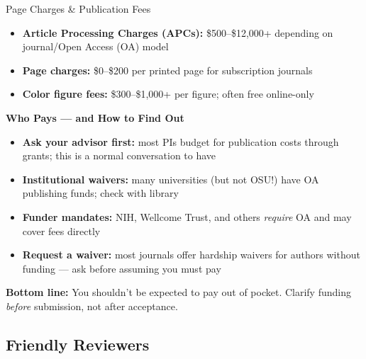 \documentclass{beamer}
\begin{document}
\begin{frame}{Page Charges \& Publication Fees}

  \footnotesize
  \begin{itemize}
    \item \textbf{Article Processing Charges (APCs):} \$500--\$12,000+
      depending on journal/Open Access (OA) model
    \item \textbf{Page charges:}  \$0--\$200 per printed page for
      subscription journals
    \item \textbf{Color figure fees:} \$300--\$1,000+ per figure;
      often free online-only
  \end{itemize}

  \medskip
  \textbf{Who Pays --- and How to Find Out}
  \begin{itemize}
    \item \textbf{Ask your advisor first:} most PIs budget for publication
      costs through grants; this is a normal conversation to have
    \item \textbf{Institutional waivers:} many universities (but not OSU!) have
      OA publishing funds; check with library
    \item \textbf{Funder mandates:} NIH, Wellcome Trust, and others
      \emph{require} OA and may cover fees directly
    \item \textbf{Request a waiver:} most journals offer hardship waivers
      for authors without funding --- ask before assuming you must pay
  \end{itemize}

  \medskip
  \alert{\textbf{Bottom line:}} You shouldn't be expected to pay out of pocket.
  Clarify funding \emph{before} submission, not after acceptance.

\end{frame}




\subsection{Friendly Reviewers}
\end{document}
